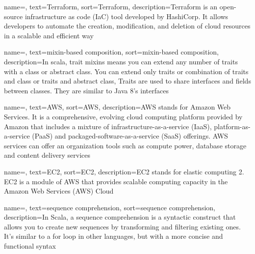 
\renewcommand{\acronymname}{Acronyms and abbreviations}




%


{
    name=,
    text=Terraform,
    sort=Terraform,
    description={Terraform is an open-source infrastructure as code (IaC) tool developed by HashiCorp. It allows developers to automate the creation, modification, and deletion of cloud resources in a scalable and efficient way }
}

{
    name=,
    text=mixin-based composition,
    sort=mixin-based composition,
    description={In scala, trait mixins means you can extend any number of traits with a class or abstract class. You can extend only traits or combination of traits and class or traits and abstract class,
    Traits are used to share interfaces and fields between classes. They are similar to Java 8’s interfaces }
}

{
    name=,
    text=AWS,
    sort=AWS,
    description={AWS stands for Amazon Web Services. It is a comprehensive, evolving cloud computing platform provided by Amazon that includes a mixture of infrastructure-as-a-service (IaaS), platform-as-a-service (PaaS) and packaged-software-as-a-service (SaaS) offerings. AWS services can offer an organization tools such as compute power, database storage and content delivery services}
}


{
    name=,
    text=EC2,
    sort=EC2,
    description={EC2 stands for elastic computing 2. EC2 is a module of AWS that provides scalable computing capacity in the Amazon Web Services (AWS) Cloud }
}

{
    name=,
    text=sequence comprehension,
    sort=sequence comprehension,
    description={In Scala, a sequence comprehension is a syntactic construct that allows you to create new sequences by transforming and filtering existing ones. It's similar to a for loop in other languages, but with a more concise and functional syntax
    }
}